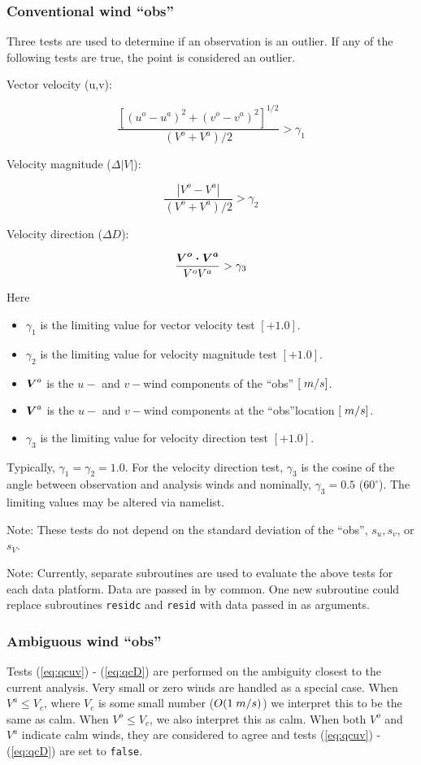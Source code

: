 \documentclass[11pt]{article}
\newcommand{\computer}[1]{{\tt #1}}
\newcommand{\degrees}[1]{\mbox{$ {#1}^\circ $}}
\newcommand{\Dot}[2]{\Vector{{#1} \cdot {#2}}}
\newcommand{\mks}[2]{\mbox{$ {#1} \; {#2} $}}
\newcommand{\obs}{``obs''}
\newcommand{\Vector}[1]{\mbox{\boldmath ${#1}$}}
\newcommand{\xxxx}[1]{\subsubsection {#1}}
\newcommand{\eql}[2]{\begin{equation} \label{eq:#1} #2 \end{equation}}
\newcommand{\eqr}[1]{(\ref{eq:#1})}
\newcommand{\vardef}[3]{\item $ {#1} $ is the {#2} $ [{#3}] $. }
\begin{document}
\xxxx {Conventional wind \obs}

Three tests are used to determine if an observation is an outlier.
If any of the following tests are true, the point is considered an
outlier.

Vector velocity (u,v):

 \eql{qcuv}{ \frac{ [ (u^o - u^a)^2 + (v^o - v^a)^2 ]^{1/2} }
   { (V^o + V^a)/2 } > \gamma_{1} }

Velocity magnitude ($\Delta |V|$):

 \eql{qcV}{ \frac{ | V^o - V^a | }
   { (V^o + V^a)/2 } > \gamma_{2} }

Velocity direction ($\Delta D$):

 \eql{qcD}{ \frac{ \Dot {\Vector{V}^o} {\Vector{V}^a} }
   { V^o V^a } > \gamma_{3} }

 Here \begin{itemize}
  \vardef{ \gamma_{1}}{limiting value for vector velocity test}{+1.0}
  \vardef{ \gamma_{2}}{limiting value for velocity magnitude test}{+1.0}
  \vardef{ \Vector{V}^o}{$u-$ and $v-$wind components of the \obs}{\mks{}{m/s}}
  \vardef{ \Vector{V}^a}{$u-$ and $v-$wind components at the \obs location}{\mks{}{m/s}}
  \vardef{ \gamma_{3}}{limiting value for velocity direction test}{+1.0}
 \end{itemize} 

Typically, $\gamma_{1} = \gamma_{2} = 1.0$.  For the velocity direction
test, $\gamma_{3}$ is the cosine of the angle between observation
and analysis winds and nominally, $\gamma_{3} = 0.5$ (\degrees{60}).
The limiting values may be altered via namelist.

Note: These tests do not depend on the standard deviation of the 
\obs, $s_u, s_v$, or $s_V$.

Note: Currently, separate subroutines are used to evaluate
the above tests for each data platform.  Data are passed in by common.
One new subroutine could replace subroutines \computer{residc} and
\computer{resid} with data passed in as arguments.

\xxxx {Ambiguous wind \obs}

Tests \eqr{qcuv} - \eqr{qcD} are performed on the ambiguity closest
to the current analysis.  Very small or zero winds are handled as a
special case.  When $V^a \leq V_c$, where $V_c$ is some small number
($O(\mks{1}{m/s})$) we interpret this to be the same as calm.  When
$V^o \leq V_c$, we also interpret this as calm.  When both $V^o$ and
$V^a$ indicate calm winds, they are considered to agree and tests
\eqr{qcuv} - \eqr{qcD} are set to \computer{false}.
\end{document}
